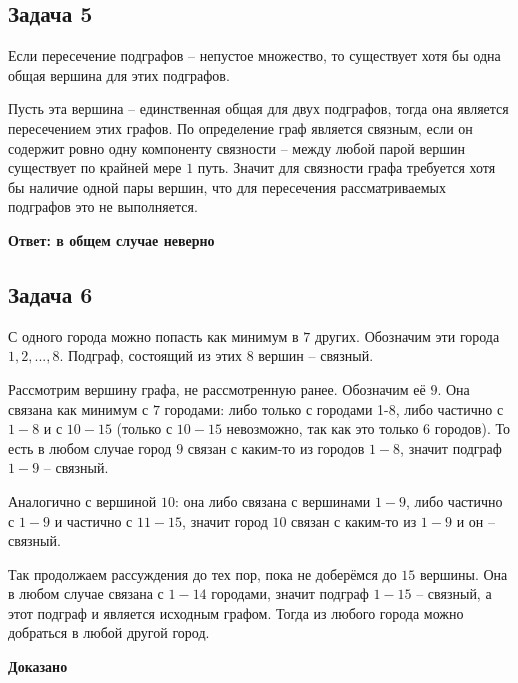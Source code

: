 \documentclass[a4paper,14pt]{article} %
\begin{document}
\begin{center}
\subsection{Задача 5}
\end{center}

Если пересечение подграфов -- непустое множество, то существует хотя бы одна общая вершина для этих подграфов.

Пусть эта вершина -- единственная общая для двух подграфов, тогда она является пересечением этих графов. По определение граф является связным, если он содержит ровно одну компоненту связности -- между любой парой вершин существует по крайней мере $1$ путь. Значит для связности графа требуется хотя бы наличие одной пары вершин, что для пересечения рассматриваемых подграфов это не выполняется.

\begin{flushright}
\begin{large}
\textbf {Ответ: в общем случае неверно}
\end{large}
\end{flushright}
\newpage
\begin{center}
\subsection{Задача 6}
\end{center}

С одного города можно попасть как минимум в $7$ других. Обозначим эти города $1, 2, ..., 8$. Подграф, состоящий из этих $8$ вершин -- связный.

Рассмотрим вершину графа, не рассмотренную ранее. Обозначим её $9$. Она связана как минимум с $7$ городами: либо только с городами 1-8, либо частично с $1-8$ и с $10-15$ (только с $10-15$ невозможно, так как это только 6 городов). То есть в любом случае город $9$ связан с каким-то из городов $1-8$, значит подграф $1-9$ -- связный.

Аналогично с вершиной $10$: она либо связана с вершинами $1-9$, либо частично с $1-9$ и частично с $11-15$, значит город $10$ связан с каким-то из $1-9$ и он -- связный.

Так продолжаем рассуждения до тех пор, пока не доберёмся до $15$ вершины. Она в любом случае связана с $1-14$ городами, значит подграф $1-15$ -- связный, а этот подграф и является исходным графом. Тогда из любого города можно добраться в любой другой город.

\begin{flushright}
\begin{large}
\textbf {Доказано}
\end{large}
\end{flushright}
\end{document}
